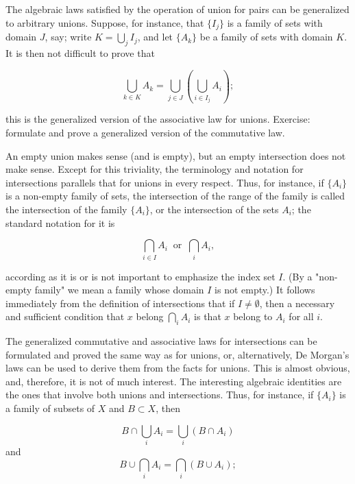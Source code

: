 The algebraic laws satisfied by the operation of union for pairs can be generalized to arbitrary unions. Suppose, for instance, that $ \{ I_{j} \}$ is a family of sets with domain $J$, say; write $K = \bigcup_{j}I_{j}$, and let $\{ A_{k} \}$ be a family of sets with domain $K$. It is then not difficult to prove that 

\begin{equation*}
\bigcup_{k \in K}A_{k} = \bigcup_{j \in J}(\bigcup_{i \in I_{j}}A_{i});
\end{equation*}

this is the generalized version of the associative law for unions. Exercise: formulate and prove a generalized version of the commutative law. 

An empty union makes sense (and is empty), but an empty intersection does not make sense. Except for this triviality, the terminology and notation for intersections parallels that for unions in every respect. Thus, for instance, if $\{ A_{i} \}$ is a non-empty family of sets, the intersection of the range of the family is called the intersection of the family $\{ A_{i} \}$, or the intersection of the sets $A_{i}$; the standard notation for it is 

\begin{equation*}
\bigcap_{i \in I}A_{i} \: \text{ or } \: \bigcap_{i}A_{i},
\end{equation*}

according as it is or is not important to emphasize the index set $I$. (By a "non-empty family" we mean a family whose domain $I$ is not empty.) It follows immediately from the definition of intersections that if $I \neq \emptyset$, then a necessary and sufficient condition that $x$ belong $\bigcap_{i}A_{i}$ is that $x$ belong to $A_{i}$ for all $i$. 

The generalized commutative and associative laws for intersections can be formulated and proved the same way as for unions, or, alternatively, De Morgan's laws can be used to derive them from the facts for unions. This is almost obvious, and, therefore, it is not of much interest. The interesting algebraic identities are the ones that involve both unions and intersections. Thus, for instance, if $\{ A_{i} \}$ is a family of subsets of $X$ and $B \subset X$, then 

\begin{equation*}
B \cap \bigcup_{i}A_{i} = \bigcup_{i}(B \cap A_{i})
\end{equation*}
and
\begin{equation*}
B \cup \bigcap_{i}A_{i} = \bigcap_{i}(B \cup A_{i});
\end{equation*}

